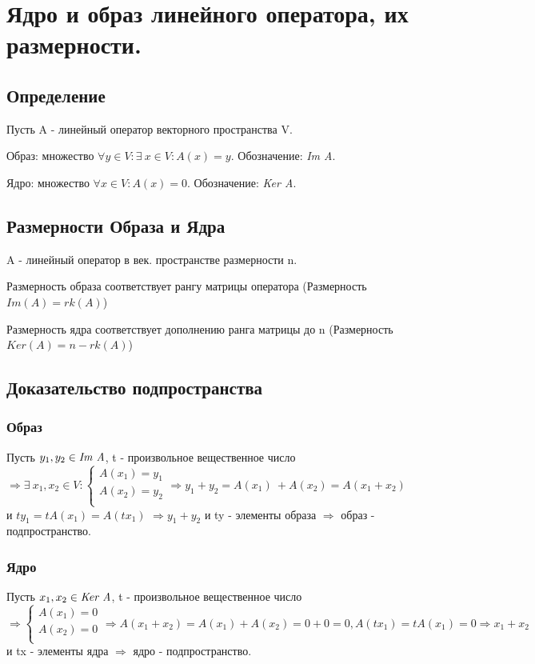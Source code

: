 \documentclass[12pt]{article}
\begin{document}
\section{Ядро и образ линейного оператора, их размерности.}
\subsection{Определение}
Пусть A - линейный оператор векторного пространства V.

Образ: множество $\forall y \in V : \exists\ x \in V : A(x) = y$. Обозначение: \emph{Im A}.

Ядро: множество $\forall x \in V : A(x) = 0$. Обозначение: \emph{Ker A}.

\subsection{Размерности Образа и Ядра}
A - линейный оператор в век. пространстве размерности n.

Размерность образа соответствует рангу матрицы оператора (Размерность $Im(A) = rk(A)$)

Размерность ядра соответствует дополнению ранга матрицы до n (Размерность $Ker(A) = n - rk(A)$)

\subsection{Доказательство подпространства}

\subsubsection{Образ}
Пусть $y_1, y_2 \in \emph{Im A}$, t - произвольное вещественное число $\Rightarrow \exists\ x_1, x_2 \in V : \begin{cases}
        A(x_1) = y_1 \\
        A(x_2) = y_2 \\
    \end{cases}
    \Rightarrow y_1 + y_2 = A(x_1)\ + A(x_2) = A(x_1 + x_2)$ и $ty_1 = tA(x_1) = A(tx_1)$ $\Rightarrow y_1 + y_2$ и ty - элементы образа $\Rightarrow$ образ - подпространство.

\subsubsection{Ядро}
Пусть $x_1, x_2 \in \emph{Ker A}$, t - произвольное вещественное число $\Rightarrow \begin{cases}
        A(x_1) = 0 \\
        A(x_2) = 0 \\
    \end{cases}
    \Rightarrow A(x_1+x_2) = A(x_1) + A(x_2) = 0 + 0 = 0, A(tx_1) = tA(x_1) = 0 \Rightarrow x_1 + x_2$ и tx - элементы ядра $\Rightarrow$ ядро - подпространство.
\end{document}
